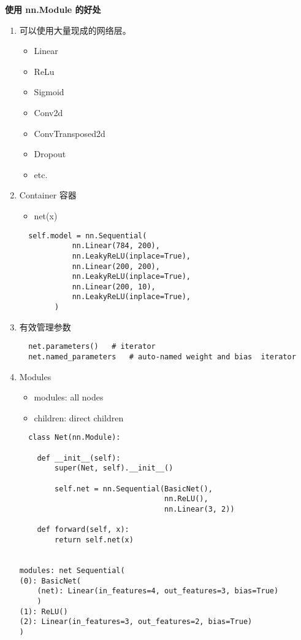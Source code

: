 \textbf{使用 nn.Module 的好处}
\begin{enumerate}
  \item 可以使用大量现成的网络层。
  \begin{itemize}
    \item Linear
    \item ReLu
    \item Sigmoid
    \item Conv2d
    \item ConvTransposed2d
    \item Dropout
    \item etc.
  \end{itemize}
  \item Container 容器
  \begin{itemize}
    \item net(x)
  \end{itemize}
  \begin{lstlisting}
  self.model = nn.Sequential(
            nn.Linear(784, 200),
            nn.LeakyReLU(inplace=True),
            nn.Linear(200, 200),
            nn.LeakyReLU(inplace=True),
            nn.Linear(200, 10),
            nn.LeakyReLU(inplace=True),
        )
  \end{lstlisting}
  \item 有效管理参数
  \begin{lstlisting}
  net.parameters()   # iterator
  net.named_parameters   # auto-named weight and bias  iterator
  \end{lstlisting}
  \item Modules
  \begin{itemize}
    \item modules: all nodes
    \item children: direct children
  \end{itemize}
  \begin{lstlisting}
  class Net(nn.Module):

    def __init__(self):
        super(Net, self).__init__()

        self.net = nn.Sequential(BasicNet(),
                                 nn.ReLU(),
                                 nn.Linear(3, 2))

    def forward(self, x):
        return self.net(x)
        

modules: net Sequential(
(0): BasicNet(
    (net): Linear(in_features=4, out_features=3, bias=True)
    )
(1): ReLU()
(2): Linear(in_features=3, out_features=2, bias=True)
)


\end{lstlisting}
\end{enumerate}
